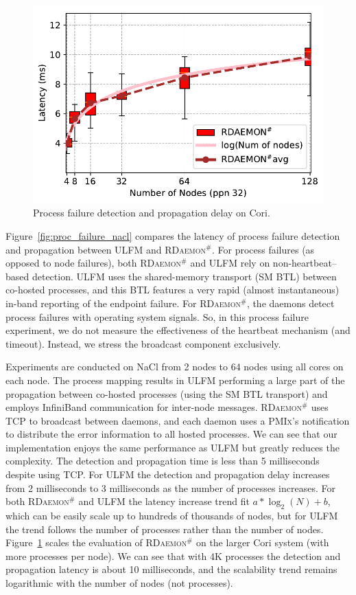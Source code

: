 \documentclass[sigconf]{acmart}
\newcommand{\pmix}[0]{\textsc{PMIx}\xspace}
\newcommand{\ulfm}[0]{\textsc{ULFM}\xspace}
\newcommand{\ourwork}[0]{\textsc{RDaemon}\ensuremath{^\#}\xspace}
\begin{document}
\begin{figure}[h]
  \centering
  \includegraphics[width=\linewidth]{Cori_Process_Failure_fit.pdf}
  \caption{Process failure detection and propagation delay on Cori.}
  \label{fig:proc_failure_cori}
\end{figure}

Figure~\ref{fig:proc_failure_nacl} compares the latency of process failure detection and propagation between \ulfm and \ourwork. For process failures (as opposed to node failures), both 
\ourwork and \ulfm rely on non-heartbeat--based detection. 
%
\ulfm uses the 
shared-memory transport (SM BTL) between co-hosted processes, and this BTL 
features a very rapid (almost instantaneous) in-band reporting of the 
endpoint failure. For \ourwork, the daemons detect process failures
with operating system signals. 
%
So, in this process failure experiment, we do not measure 
the effectiveness of the heartbeat mechanism (and timeout). Instead, we  
stress the broadcast component exclusively.

Experiments are conducted on NaCl from 2 nodes to 64 nodes using all cores on each node.
The process mapping results in \ulfm performing a large part of the 
propagation between co-hosted processes (using the SM BTL transport) 
and employs InfiniBand communication for inter-node messages. 
\ourwork uses TCP to broadcast between daemons, and each daemon uses a
\pmix's notification to distribute the error information to all hosted processes.
%
 We can see that our implementation enjoys the same performance as \ulfm but greatly reduces the complexity. The detection and propagation time is less than 5 milliseconds despite using TCP. For \ulfm the detection and propagation delay increases from 2 milliseconds to 3 milliseconds as the  number of processes increases. For both \ourwork and \ulfm the latency increase trend fit $ a*\log_2(N) + b $, which can be easily scale up to hundreds of thousands of nodes, but for \ulfm
the trend follows the number of processes rather than the number of nodes. Figure~\ref{fig:proc_failure_cori} scales the evaluation of \ourwork on the larger Cori system (with more processes per node). We can see that with 4K processes the detection and propagation latency is about 10 milliseconds, and the scalability trend remains logarithmic with the number of nodes (not processes).
\end{document}
